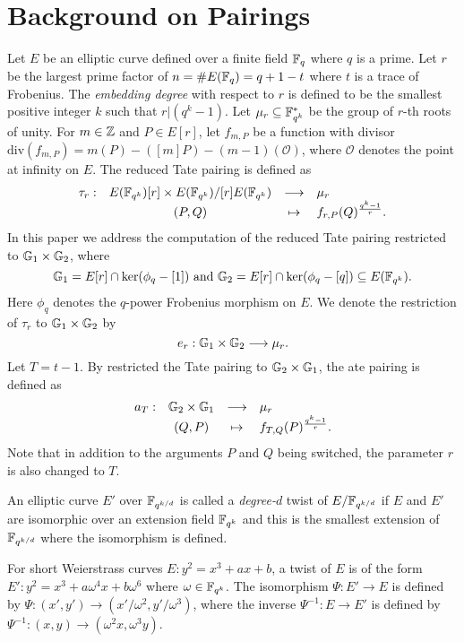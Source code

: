 \section{Background on Pairings}
\label{sec:background}

Let $E$ be an elliptic curve defined over a finite field $\mathbb{F}_{q}$ where $q$ is a prime.
Let $r$ be the largest prime factor of $n = \#E(\mathbb{F}_{q}) = q + 1 - t$ where $t$ is a trace of Frobenius.
The \emph{embedding degree} with respect to $r$ is defined to be the smallest positive integer $k$ such that $r | (q^k-1)$.
Let $\mu_{r} \subseteq \mathbb{F}_{q^{k}}^{*}$ be the group of $r$-th roots of unity.
For $m \in \mathbb{Z}$ and $P \in E[r]$,
let $f_{m,P}$ be a function with divisor 
$\text{div}(f_{m,P}) = m(P) - ([m]P) - (m-1)(\mathcal{O})$,
where $\mathcal{O}$ denotes the point at infinity on $E$.
The reduced Tate pairing is defined as
\[\begin{array}{rccl}
\tau_{r} :	& E(\mathbb{F}_{q^{k}})[r] \times E(\mathbb{F}_{q^{k}})/[r]E(\mathbb{F}_{q^{k}})	& \longrightarrow	& \mu_{r} \\
		& (P,Q)								& \mapsto		& f_{r,P}(Q)^{\frac{q^{k}-1}{r}}.
\end{array}\]
In this paper we address the computation of the reduced Tate pairing restricted to $\mathbb{G}_{1} \times \mathbb{G}_{2}$, where
$$\mathbb{G}_{1} = E[r] \cap \ker(\phi_{q}-[1]) \text{ and }
\mathbb{G}_{2} = E[r] \cap \ker(\phi_{q} - [q]) \subseteq E(\mathbb{F}_{q^{k}}).$$
Here $\phi_{q}$ denotes the $q$-power Frobenius morphism on $E$.
We denote the restriction of $\tau_{r}$ to $\mathbb{G}_{1} \times \mathbb{G}_{2}$ by
$$e_{r} : \mathbb{G}_{1} \times \mathbb{G}_{2} \longrightarrow \mu_{r}.$$
Let $T = t-1$.
By restricted the Tate pairing to $\mathbb{G}_{2} \times \mathbb{G}_{1}$, the ate pairing is defined as
\[\begin{array}{rccl}
a_{T} :	& \mathbb{G}_{2} \times \mathbb{G}_{1}	& \longrightarrow	& \mu_{r} \\
	& (Q,P) 		& \mapsto		& f_{T,Q}(P)^{\frac{q^{k}-1}{r}}.
\end{array}\]
Note that in addition to the arguments $P$ and $Q$ being switched, the parameter $r$ is also changed to $T$.

An elliptic curve $E'$ over $\mathbb{F}_{q^{k/d}}$ is called a \emph{degree-$d$} twist of $E/\mathbb{F}_{q^{k/d}}$
if $E$ and $E'$ are isomorphic over an extension field $\mathbb{F}_{q^k}$
and this is the smallest extension of $\mathbb{F}_{q^{k/d}}$ where the isomorphism is defined.

For short Weierstrass curves $E: y^2 = x^3 + ax + b$,
a twist of $E$ is of the form $E': y^2 = x^3 + a \omega^4 x + b \omega^6$
where $\omega \in \mathbb{F}_{q^k}$.
The isomorphism $\Psi : E' \rightarrow E$ is defined by
$\Psi : (x',y') \rightarrow (x'/\omega^2,y'/\omega^3)$,
where the inverse $\Psi^{-1} : E \rightarrow E'$ is defined by
$\Psi^{-1} : (x,y) \rightarrow (\omega^2 x, \omega^3 y)$.

